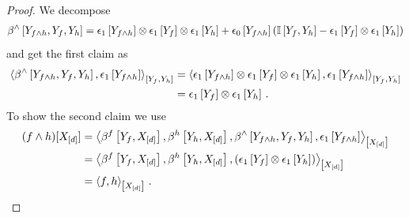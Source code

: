 \begin{proof}
    We decompose
    \begin{align*}
        \bencodingofat{\land}{\headvariableof{\exformula\land\secexformula},\formulavar,\secexformulavar}
        = \tbasisat{\headvariableof{\exformula\land\secexformula}} \otimes \tbasisat{\formulavar} \otimes \tbasisat{\secexformulavar}
        + \fbasisat{\headvariableof{\exformula\land\secexformula}} \left( \onesat{\formulavar,\secexformulavar} -  \tbasisat{\formulavar} \otimes \tbasisat{\secexformulavar} \right)
    \end{align*}
    and get the first claim as
    \begin{align*}
        \contractionof{
            \bencodingofat{\land}{\headvariableof{\exformula\land\secexformula},\formulavar,\secexformulavar},\tbasisat{\headvariableof{\exformula\land\secexformula}}
        }{\formulavar,\secexformulavar}
        & = \contractionof{
            \tbasisat{\headvariableof{\exformula\land\secexformula}} \otimes \tbasisat{\formulavar} \otimes \tbasisat{\secexformulavar},\tbasisat{\headvariableof{\exformula\land\secexformula}}
        }{\formulavar,\secexformulavar} \\
        & = \tbasisat{\formulavar} \otimes \tbasisat{\secexformulavar} \, .
    \end{align*}
    To show the second claim we use
    \begin{align*}
    (\exformula\land\secexformula)[\shortcatvariables]
        &= \contractionof{
            \bencodingofat{\exformula}{\formulavar,\shortcatvariables},
            \bencodingofat{\secexformula}{\secexformulavar,\shortcatvariables},
            \bencodingofat{\land}{\headvariableof{\exformula\land\secexformula},\formulavar,\secexformulavar},
            \tbasisat{\headvariableof{\exformula\land\secexformula}}
        }{\shortcatvariables} \\
        &  = \contractionof{
            \bencodingofat{\exformula}{\formulavar,\shortcatvariables},
            \bencodingofat{\secexformula}{\secexformulavar,\shortcatvariables},
            (\tbasisat{\formulavar}\otimes \tbasisat{\secexformulavar})
        }{\shortcatvariables} \\
        &= \contractionof{\exformula,\secexformula}{\shortcatvariables} \, . \qedhere
    \end{align*}
\end{proof}

